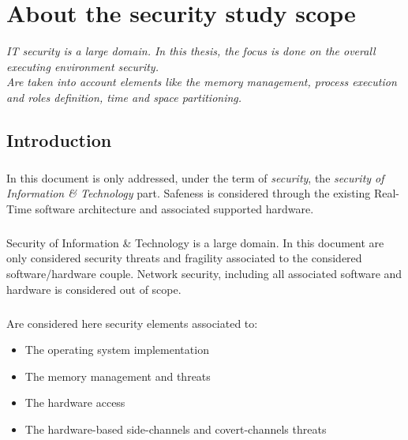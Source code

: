 
\chapter{About the security study scope}

{\it
IT security is a large domain. In this thesis, the focus is done on the overall executing
environment security.\\
Are taken into account elements like the memory management, process execution and roles definition,
time and space partitioning.
}

\doMinitoc

\section{Introduction}

\paragraph{}
In this document is only addressed, under the term of {\it security}, the {\it security of
Information \& Technology} part. Safeness is considered through the existing Real-Time software
architecture and associated supported hardware.

\paragraph{}
Security of Information \& Technology is a large domain. In this document are only considered
security threats and fragility associated to the considered software/hardware couple. Network
security, including all associated software and hardware is considered out of scope.

\paragraph{}
Are considered here security elements associated to:
\begin{itemize}
\item The operating system implementation
\item The memory management and threats
\item The hardware access
\item The hardware-based side-channels and covert-channels threats
\end{itemize}

